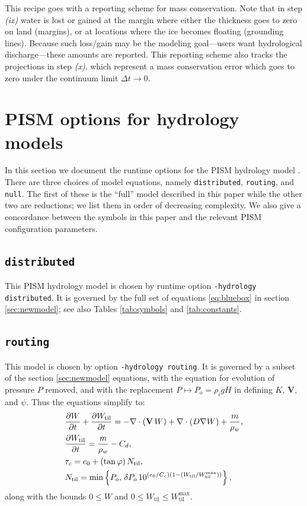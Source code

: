 \documentclass[gmd]{copernicus}   %
\newcommand{\text}{\textrm}
\newcommand\bV{\mathbf{V}}
\newcommand{\ddt}[1]{\ensuremath{\frac{\partial #1}{\partial t}}}
\newcommand{\Div}{\nabla\cdot}
\newcommand{\grad}{\nabla}
\newcommand{\Wtil}{W_{\text{til}}}
\newcommand{\Wtilmax}{W_{\text{til}}^{\text{max}}}
\begin{document}
\medskip
This recipe goes with a reporting scheme for mass conservation.  Note that in step \emph{(ix)} water is lost or gained at the margin where either the thickness goes to zero on land (margins), or at locations where the ice becomes floating (grounding lines).  Because such loss/gain may be the modeling goal---users want hydrological discharge---these amounts are reported.  This reporting scheme also tracks the projections in step \emph{(x)}, which represent a mass conservation error which goes to zero under the continuum limit $\Delta t\to 0$.


\section{PISM options for hydrology models} \label{sec:pismdoc}

In this section we document the runtime options for the PISM hydrology model \citep{pism-user-manual}.  There are three choices of model equations, namely \texttt{distributed}, \texttt{routing}, and \texttt{null}.  The first of these is the ``full'' model described in this paper while the other two are reductions; we list them in order of decreasing complexity.  We also give a concordance between the symbols in this paper and the relevant PISM configuration parameters.

\subsection{\texttt{distributed}}  This PISM hydrology model is chosen by runtime option \texttt{-hydrology distributed}.  It is governed by the full set of equations \eqref{eq:bluebox} in section \ref{sec:newmodel}; see also Tables \ref{tab:symbols} and \ref{tab:constants}.

\subsection{\texttt{routing}}  This model is chosen by option \texttt{-hydrology routing}.  It is governed by a subset of the section \ref{sec:newmodel} equations, with the equation for evolution of pressure $P$ removed, and with the replacement $P\mapsto P_o = \rho_i g H$ in defining $K$, $\bV$, and $\psi$.  Thus the equations simplify to:
\begin{align}
&\ddt{W} + \ddt{\Wtil} = - \Div\left(\bV\, W\right) + \Div \left(D \grad W\right) + \frac{m}{\rho_w}, \notag \\
&\frac{\partial \Wtil}{\partial t} = \frac{m}{\rho_w} - C_d, \notag \\
&\tau_c = c_0 + (\tan \varphi)\, \Ntil, \notag \\
&\Ntil = \min\left\{P_o,\, \delta P_o \, 10^{(e_0/C_c) \left(1 - (\Wtil/\Wtilmax)\right)}\right\}, \notag
\end{align}
along with the bounds $0\le W$ and $0\le \Wtil \le \Wtilmax$.
\end{document}
